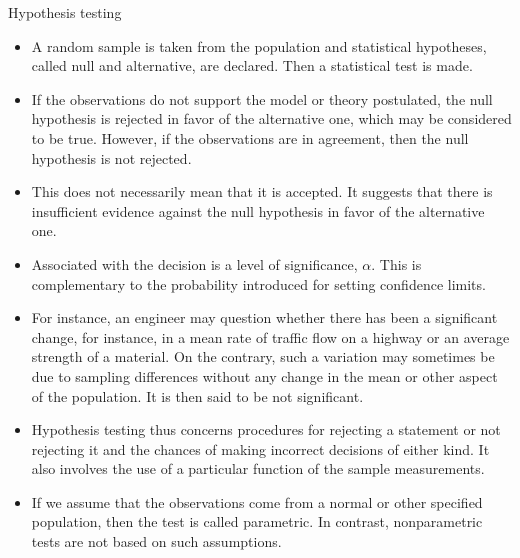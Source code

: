 \documentclass[8pt]{beamer}
\renewcommand{\emph}[1]{\textcolor{myorange}{#1}}
\begin{document}
\begin{frame}{Hypothesis testing}
    \begin{itemize}
        \item A random sample is taken from the population and \alert{statistical hypotheses}, called \alert{null} and \alert{alternative}, are declared. Then a statistical test is made.
        \item If the observations do not support the model or theory postulated, the \emph{null hypothesis} is \alert{rejected} in favor of the alternative one, which may be considered to be true. However, if the observations are in agreement, then the null hypothesis is \alert{not rejected}.
        \item This does not necessarily mean that it is accepted. It suggests that there is insufficient evidence against the \emph{null hypothesis} in favor of the alternative one.
        \item Associated with the decision is a \alert{level of significance}, $\alpha$. This is complementary to the probability introduced  for setting confidence limits.
        \item For instance, an engineer may question whether there has been a significant change, for instance, in a mean rate of traffic flow on a highway or an average strength of a material. On the contrary, such a variation may sometimes be due to sampling differences without any change in the mean or other aspect of the population. It is then said to be \alert{not significant}.
        \item Hypothesis testing thus concerns procedures for rejecting a statement or not rejecting it and the chances of making incorrect decisions of either kind. It also involves the use of a particular function of the sample measurements.
        \item If we assume that the observations come from a normal or other specified population, then the test is called \alert{parametric}. In contrast, \alert{nonparametric tests} are not based on such assumptions.
    \end{itemize}
\end{frame}
\end{document}
